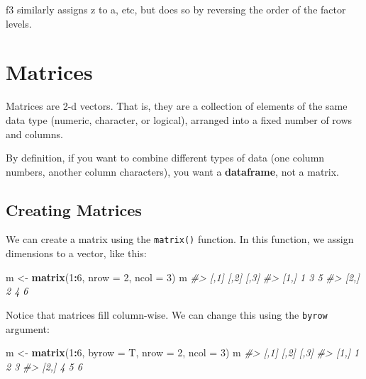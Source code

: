 \documentclass[]{book}
\newenvironment{Shaded}{\begin{snugshade}}{\end{snugshade}}
\newcommand{\KeywordTok}[1]{\textcolor[rgb]{0.13,0.29,0.53}{\textbf{#1}}}
\newcommand{\DataTypeTok}[1]{\textcolor[rgb]{0.13,0.29,0.53}{#1}}
\newcommand{\DecValTok}[1]{\textcolor[rgb]{0.00,0.00,0.81}{#1}}
\newcommand{\StringTok}[1]{\textcolor[rgb]{0.31,0.60,0.02}{#1}}
\newcommand{\CommentTok}[1]{\textcolor[rgb]{0.56,0.35,0.01}{\textit{#1}}}
\newcommand{\OperatorTok}[1]{\textcolor[rgb]{0.81,0.36,0.00}{\textbf{#1}}}
\newcommand{\NormalTok}[1]{#1}
\begin{document}
f3 similarly assigns z to a, etc, but does so by reversing the order of
the factor levels.

\hypertarget{matrices}{\section{Matrices}\label{matrices}}

Matrices are 2-d vectors. That is, they are a collection of elements of
the same data type (numeric, character, or logical), arranged into a
fixed number of rows and columns.

By definition, if you want to combine different types of data (one
column numbers, another column characters), you want a
\textbf{dataframe}, not a matrix.

\subsection{Creating Matrices}\label{creating-matrices}

We can create a matrix using the \texttt{matrix()} function. In this
function, we assign dimensions to a vector, like this:

\begin{Shaded}
\begin{Highlighting}[]
\NormalTok{m <-}\StringTok{ }\KeywordTok{matrix}\NormalTok{(}\DecValTok{1}\OperatorTok{:}\DecValTok{6}\NormalTok{, }\DataTypeTok{nrow =} \DecValTok{2}\NormalTok{, }\DataTypeTok{ncol =} \DecValTok{3}\NormalTok{)}
\NormalTok{m}
\CommentTok{#>      [,1] [,2] [,3]}
\CommentTok{#> [1,]    1    3    5}
\CommentTok{#> [2,]    2    4    6}
\end{Highlighting}
\end{Shaded}

Notice that matrices fill column-wise. We can change this using the
\texttt{byrow} argument:

\begin{Shaded}
\begin{Highlighting}[]
\NormalTok{m <-}\StringTok{ }\KeywordTok{matrix}\NormalTok{(}\DecValTok{1}\OperatorTok{:}\DecValTok{6}\NormalTok{, }\DataTypeTok{byrow =}\NormalTok{ T, }\DataTypeTok{nrow =} \DecValTok{2}\NormalTok{, }\DataTypeTok{ncol =} \DecValTok{3}\NormalTok{)}
\NormalTok{m}
\CommentTok{#>      [,1] [,2] [,3]}
\CommentTok{#> [1,]    1    2    3}
\CommentTok{#> [2,]    4    5    6}
\end{Highlighting}
\end{Shaded}
\end{document}
